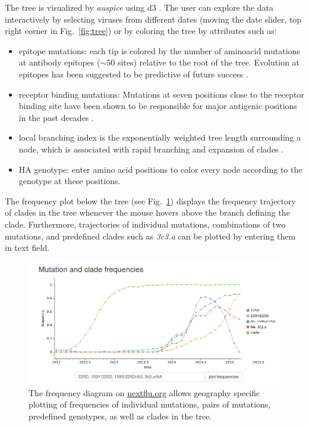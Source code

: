 \documentclass{bioinfo}
\newcommand{\FIG}[1]{Fig.~\ref{fig:#1}}
\newcommand{\auspice}{\textit{auspice}}
\begin{document}
The tree is visualized by \auspice{} using d3 \citep{bostock_d3_2011}.
The user can explore the data interactively by selecting viruses from different dates (moving the date slider, top right corner in \FIG{tree}) or by coloring the tree by attributes such as:
\begin{itemize}
	\item epitope mutations: each tip is colored by the number of aminoacid mutations at antibody epitopes ($\sim 50$ sites) relative to the root of the tree. Evolution at epitopes has been suggested to be predictive of future success \citep{luksza_predictive_2014}.
    \item receptor binding mutations: Mutations at seven positions close to the receptor binding site have been shown to be responsible for major antigenic positions in the past decades \citep{koel_substitutions_2013}.
    \item local branching index is the exponentially weighted tree length surrounding a node, which is associated with rapid branching and expansion of clades \citep{neher_predicting_2014}.
    \item HA genotype: enter amino acid positions to color every node according to the genotype at these positions.
\end{itemize}

The frequency plot below the tree (see \FIG{freq}) displays the frequency trajectory of clades in the tree whenever the mouse hovers above the branch defining the clade. 
Furthermore, trajectories of individual mutations, combinations of two mutations, and predefined clades such as \textit{3c3.a} can be plotted by entering them in text field.

\begin{figure}[t]
	\begin{center}
	\includegraphics[width=0.99\columnwidth]{figures/frequencies}
\caption[]{The frequency diagram on \url{nextflu.org} allows geography specific
		plotting of frequencies of individual mutations, pairs of mutations, 
		predefined genotypes, as well as clades in the tree. }
\label{fig:freq}
\end{center}
\end{figure}
\end{document}
